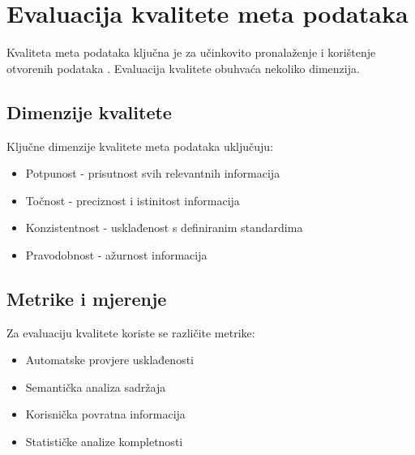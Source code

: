 \section{Evaluacija kvalitete meta podataka}
\label{sec:metadata_quality}

Kvaliteta meta podataka ključna je za učinkovito pronalaženje i korištenje otvorenih 
podataka \cite{neumaier2016automated}. Evaluacija kvalitete obuhvaća nekoliko dimenzija.

\subsection{Dimenzije kvalitete}
Ključne dimenzije kvalitete meta podataka uključuju:
\begin{itemize}
    \item Potpunost - prisutnost svih relevantnih informacija
    \item Točnost - preciznost i istinitost informacija
    \item Konzistentnost - usklađenost s definiranim standardima
    \item Pravodobnost - ažurnost informacija
\end{itemize}

\subsection{Metrike i mjerenje}
Za evaluaciju kvalitete koriste se različite metrike:
\begin{itemize}
    \item Automatske provjere usklađenosti
    \item Semantička analiza sadržaja
    \item Korisnička povratna informacija
    \item Statističke analize kompletnosti
\end{itemize} 